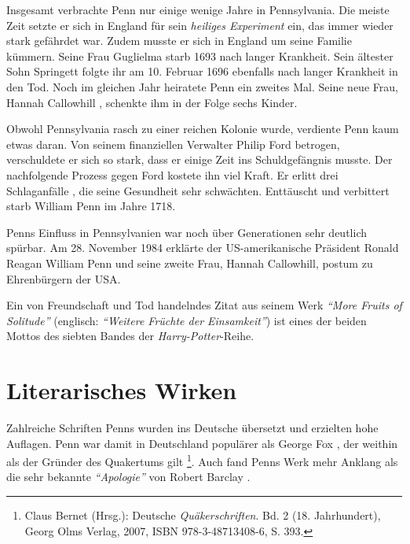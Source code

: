 \medskip

Insgesamt verbrachte Penn nur einige wenige Jahre in Pennsylvania. Die meiste
Zeit setzte er sich in England für sein \textit{heiliges Experiment} ein, das immer
wieder stark gefährdet war. Zudem musste er sich in England um seine Familie
kümmern. Seine Frau Guglielma starb 1693 nach langer Krankheit. Sein
ältester Sohn Springett folgte ihr am 10. Februar 1696 ebenfalls nach
langer Krankheit in den Tod. Noch im gleichen Jahr heiratete Penn ein zweites
Mal. Seine neue Frau, Hannah Callowhill , schenkte ihm in der Folge sechs
Kinder.

\medskip

Obwohl Pennsylvania rasch zu einer reichen Kolonie wurde, verdiente Penn kaum
etwas daran. Von seinem finanziellen Verwalter Philip Ford  betrogen,
verschuldete er sich so stark, dass er einige Zeit ins Schuldgefängnis  musste.
Der nachfolgende Prozess  gegen Ford kostete ihn viel Kraft. Er erlitt drei
Schlaganfälle , die seine Gesundheit sehr schwächten. Enttäuscht und verbittert 
starb William Penn im Jahre 1718.

Penns Einfluss in Pennsylvanien war noch über Generationen sehr deutlich
spürbar. Am 28. November 1984 erklärte der US-amerikanische Präsident
Ronald Reagan  William Penn und seine zweite Frau, Hannah Callowhill, postum zu Ehrenbürgern  der USA.

\medskip

Ein von Freundschaft und Tod
handelndes Zitat aus seinem Werk \textit{"`More Fruits of Solitude"'} (englisch: \textit{"`Weitere Früchte der Einsamkeit"'}) ist eines der beiden Mottos des siebten Bandes der \textit{Harry-Potter}-Reihe.

\medskip

\section{Literarisches Wirken}

Zahlreiche Schriften Penns wurden ins Deutsche  übersetzt und erzielten hohe
Auflagen. Penn war damit in Deutschland populärer als George Fox , der
weithin als der Gründer des Quakertums gilt \footnote{Claus Bernet (Hrsg.): Deutsche \textit{Quäkerschriften}. Bd. 2 (18.
Jahrhundert), Georg Olms Verlag, 2007, ISBN 978-3-48713408-6, S. 393.}.
Auch fand Penns Werk mehr Anklang als die sehr bekannte \textit{"`Apologie"'}  von
Robert Barclay .

